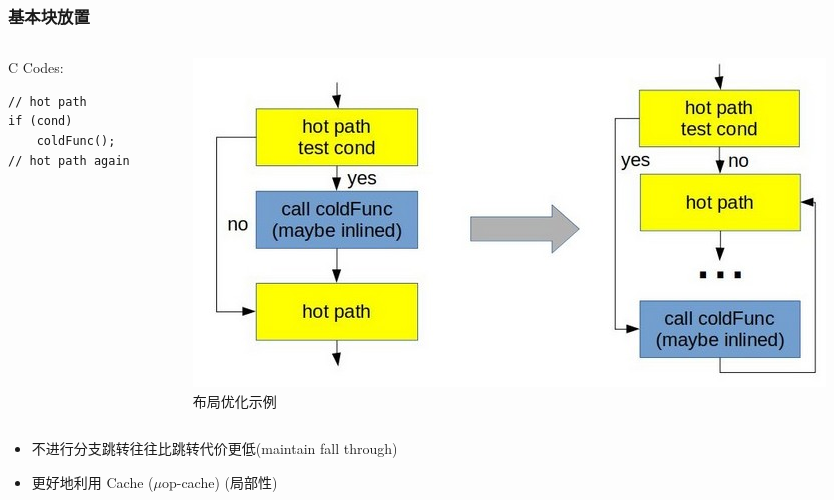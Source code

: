 \begin{frame}[fragile]
    \frametitle{基本块放置}

    \begin{columns}
        \begin{column}{0.3\textwidth}
            \centering
            C Codes:
            \begin{lstlisting}
// hot path
if (cond)
    coldFunc();
// hot path again\end{lstlisting}
        \end{column}
        \begin{column}{0.65\textwidth}
            \begin{figure}
                \centering
                \includegraphics[width=1.\textwidth]{images/hot_cold_placement.jpg}
                \caption{布局优化示例}
            \end{figure}
        \end{column}
    \end{columns}
    \begin{itemize}
        \item 不进行分支跳转往往比跳转代价更低(maintain fall through)
        \item 更好地利用 Cache ($\mu$op-cache) (局部性)
    \end{itemize}

\end{frame}

